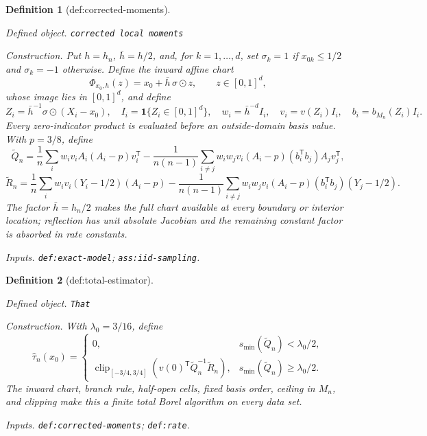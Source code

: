 \documentclass{article}
\newtheorem{definition}{Definition}
\begin{document}
\begin{definition}[def:corrected-moments]\label{def:corrected-moments}
\par\smallskip\noindent\emph{Defined object.} \texttt{corrected local moments}
\par\smallskip\noindent\emph{Construction.} Put \(h=h_n\), \(\bar h=h/2\), and, for \(k=1,\ldots,d\), set \(\sigma_k=1\) if \(x_{0k}\le1/2\) and \(\sigma_k=-1\) otherwise.  Define the inward affine chart
\[
\Phi_{x_0,h}(z)=x_0+\bar h\,\sigma\odot z,\qquad z\in[0,1]^d,
\]
whose image lies in \([0,1]^d\), and define
\[
Z_i=\bar h^{-1}\sigma\odot(X_i-x_0),\quad I_i=\mathbf1\{Z_i\in[0,1]^d\},\quad
w_i=\bar h^{-d}I_i,\quad v_i=v(Z_i)I_i,\quad b_i=b_{M_n}(Z_i)I_i.
\]
Every zero-indicator product is evaluated before an outside-domain basis value.  With \(p=3/8\), define
\[
\widetilde Q_n=\frac1n\sum_iw_iv_iA_i(A_i-p)v_i^{\mathsf T}
-\frac1{n(n-1)}\sum_{i\ne j}w_iw_jv_i(A_i-p)(b_i^{\mathsf T}b_j)A_jv_j^{\mathsf T},
\]
\[
\widetilde R_n=\frac1n\sum_iw_iv_i(Y_i-1/2)(A_i-p)
-\frac1{n(n-1)}\sum_{i\ne j}w_iw_jv_i(A_i-p)(b_i^{\mathsf T}b_j)(Y_j-1/2).
\]
The factor \(\bar h=h_n/2\) makes the full chart available at every boundary or interior location; reflection has unit absolute Jacobian and the remaining constant factor is absorbed in rate constants.
\par\smallskip\noindent\emph{Inputs.} \texttt{def:\allowbreak{}exact-\allowbreak{}model}; \texttt{ass:\allowbreak{}iid-\allowbreak{}sampling}.
\end{definition}

\begin{definition}[def:total-estimator]\label{def:total-estimator}
\par\smallskip\noindent\emph{Defined object.} \texttt{That}
\par\smallskip\noindent\emph{Construction.} With \(\lambda_0=3/16\), define
\[
\widehat\tau_n(x_0)=
\begin{cases}
0,&s_{\min}(\widetilde Q_n)<\lambda_0/2,\\
\operatorname{clip}_{[-3/4,3/4]}\!\left(v(0)^{\mathsf T}\widetilde Q_n^{-1}\widetilde R_n\right),
&s_{\min}(\widetilde Q_n)\ge\lambda_0/2.
\end{cases}
\]
The inward chart, branch rule, half-open cells, fixed basis order, ceiling in \(M_n\), and clipping make this a finite total Borel algorithm on every data set.
\par\smallskip\noindent\emph{Inputs.} \texttt{def:\allowbreak{}corrected-\allowbreak{}moments}; \texttt{def:\allowbreak{}rate}.
\end{definition}
\end{document}
